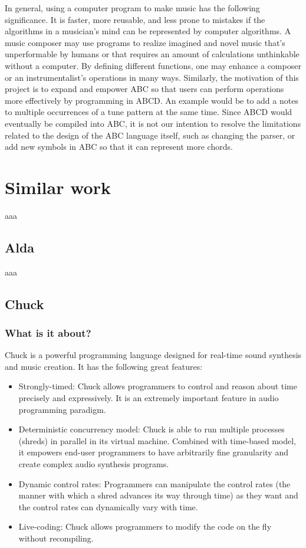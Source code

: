 In general, using a computer program to make music has the following significance. It is faster, more reusable, and less prone to mistakes if the algorithms in a musician's mind can be represented by computer algorithms. A music composer may use programs to realize imagined and novel music that’s unperformable by humans or that requires an amount of calculations unthinkable without a computer. By defining different functions, one may enhance a composer or an instrumentalist's operations in many ways\cite{Dobrian88}. Similarly, the motivation of this project is to expand and empower ABC so that users can perform operations more effectively by programming in ABCD. An example would be to add a notes to multiple occurrences of a tune pattern at the same time.  Since ABCD would eventually be compiled into ABC, it is not our intention to resolve the limitations related to the design of the ABC language itself, such as changing the parser, or add new symbols in ABC so that it can represent more chords. 
 


\section{Similar work}

aaa

\subsection{Alda}

aaa

\subsection{Chuck}

	\subsubsection{What is it about?}

	Chuck is a powerful programming language designed for real-time sound synthesis and music creation\cite{WangCook02}.  It has the following great features\cite{Wang08}:
	\begin{itemize}
	\item Strongly-timed: Chuck allows programmers to control and reason about time precisely and expressively. It is an extremely important feature in audio programming paradigm.
	\item Deterministic concurrency model: Chuck is able to run multiple processes (shreds) in parallel in its virtual machine. Combined with time-based model, it empowers end-user programmers to have arbitrarily fine granularity and create complex audio synthesis programs. 
	\item Dynamic control rates: Programmers can manipulate the control rates (the manner with which a shred advances its way through time\cite{Wang08}) as they want and the control rates can dynamically vary with time.
	\item Live-coding:  Chuck allows programmers to modify the code on the fly without recompiling.
	\end{itemize}

